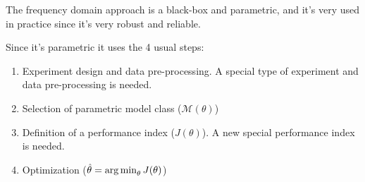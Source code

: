 The frequency domain approach is a black-box and parametric, and it's very used in practice since it's very robust and reliable.

Since it's parametric it uses the 4 usual steps:
\begin{enumerate}
    \item Experiment design and data pre-processing. A special type of experiment and data pre-processing is needed.
    \item Selection of parametric model class ($\mathcal{M}(\theta)$)
    \item Definition of a performance index ($J(\theta)$). A new special performance index is needed.
    \item Optimization ($\hat{\theta} = \operatorname*{arg\,min}_\theta J(\theta)$)
\end{enumerate}

